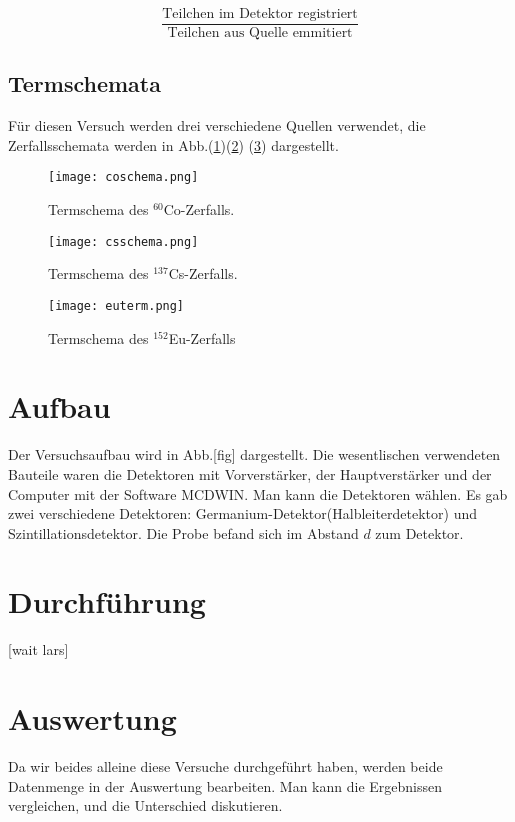 \documentclass[ngerman,11pt]{article}
\begin{document}
\begin{multicols}{2}
		\[
		\frac{\text{Teilchen im Detektor registriert}}{\text{Teilchen aus Quelle emmitiert}}
		\]

		\subsection{Termschemata}
		F\"ur diesen Versuch werden drei verschiedene Quellen verwendet, die Zerfallsschemata werden in Abb.(\ref{fig:coterm})(\ref{fig:csterm}) (\ref{fig:euterm}) dargestellt.
		\begin{figure}[H]
			\centering
			\texttt{[image: coschema.png]}
			\caption{Termschema des $^{60}$Co-Zerfalls. \protect\footnotemark[1]}
			\label{fig:coterm}
		\end{figure}
		\begin{figure}[H]
			\centering
			\texttt{[image: csschema.png]}
			\caption{Termschema des $^{137}$Cs-Zerfalls. \protect\footnotemark[2]}
			\label{fig:csterm}
		\end{figure}

		\begin{figure}[H]
			\centering
			\texttt{[image: euterm.png]}
			\caption{Termschema des $^{152}$Eu-Zerfalls\cite{kern}}
			\label{fig:euterm}
		\end{figure}

		\section{Aufbau}
		Der Versuchsaufbau wird in Abb.[fig] dargestellt. Die wesentlischen verwendeten Bauteile waren die Detektoren mit Vorverst\"arker, der Hauptverst\"arker und der Computer mit der Software MCDWIN. Man kann die Detektoren w\"ahlen. Es gab zwei verschiedene Detektoren: Germanium-Detektor(Halbleiterdetektor) und Szintillationsdetektor. Die Probe befand sich im Abstand $d$ zum Detektor.
		\section{Durchf\"uhrung}
		[wait lars]
		\section{Auswertung}
		Da wir beides alleine diese Versuche durchgef\"uhrt haben, werden beide Datenmenge in der Auswertung bearbeiten. Man kann die Ergebnissen vergleichen, und die Unterschied diskutieren. 







	\end{multicols}
\end{document}
